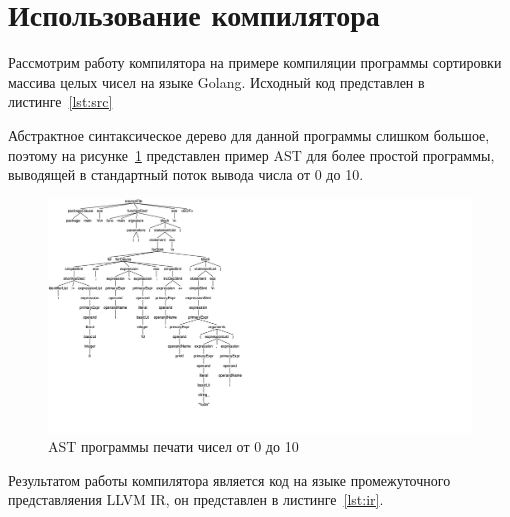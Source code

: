 \section{Использование компилятора}\label{sec:compilation}
Рассмотрим работу компилятора на примере компиляции программы сортировки массива целых чисел на языке Golang.
Исходный код представлен в листинге~\ref{lst:src}
\begingroup

\endgroup

Абстрактное синтаксическое дерево для данной программы слишком большое, поэтому на рисунке~\ref{fig:tree}
представлен пример AST для более простой программы, выводящей в стандартный поток вывода числа от 0 до 10.
\begin{figure}[h!]
    \centering
    \includegraphics[scale=0.4]{img/tree}
    \caption{AST программы печати чисел от 0 до 10}
    \label{fig:tree}
\end{figure}

Результатом работы компилятора является код на языке промежуточного представляения LLVM IR, он представлен в
листинге~\ref{lst:ir}.
\begingroup

\endgroup

